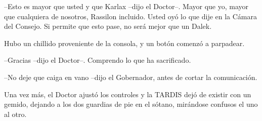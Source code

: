 --Esto es mayor que usted y que Karlax --dijo el Doctor--. Mayor que yo, mayor que cualquiera de nosotros, Rassilon incluido. Usted oyó lo que dije en la Cámara del Consejo. Si permite que esto pase, no será mejor que un Dalek.

Hubo un chillido proveniente de la consola, y un botón comenzó a parpadear.

--Gracias --dijo el Doctor--. Comprendo lo que ha sacrificado.

--No deje que caiga en vano --dijo el Gobernador, antes de cortar la comunicación.

Una vez más, el Doctor ajustó los controles y la TARDIS dejó de existir con un gemido, dejando a los dos guardias de pie en el sótano, mirándose confusos el uno al otro.



